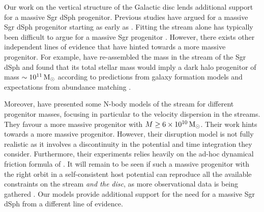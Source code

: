 \documentclass[useAMS,usenatbib]{mnras}
\begin{document}
{Our work on the vertical structure of the Galactic disc lends additional support for a massive Sgr dSph progenitor. Previous studies have argued for a massive Sgr dSph progenitor starting as early as \cite{jiang00}. Fitting the stream alone has typically been difficult to argue for a massive Sgr progenitor \citep{johnston95,helmi01,helmi04,johnston05,law10, penarrubia10}. However, there exists other independent lines of evidence that have hinted towards a more massive progenitor. For example, \cite{ostholt10} have re-assembled the mass in the stream of the Sgr dSph and found that its total stellar mass would imply a dark halo progenitor of mass $\sim 10^{11}\,\rm{M_{\odot}}$ according to predictions from galaxy formation models \citep{Guo2010} and expectations from abundance matching \citep{Behroozi2012, Moster2013}. 

Moreover, \cite{gibbons16} have presented some N-body models of the stream for different progenitor masses, focusing in particular to the velocity dispersion in the streams. They favour a more massive progenitor with $M\geq 6\times10^{10} \,\rm{M_{\odot}}$. Their work hints towards a more massive progenitor. However, their disruption model is not fully realistic as it involves a discontinuity in the potential and time integration they consider. Furthermore, their experiments relies heavily on the ad-hoc dynamical friction formula of \cite{Chandrasekhar1943}. It will remain to be seen if such a massive progenitor with the right orbit in a self-consistent host potential can reproduce all the available constraints on the stream {\it and the disc}, as more observational data is being gathered \citep{sesar17}. Our models provide additional support for the need for a massive Sgr dSph from a different line of evidence.

}
\end{document}
